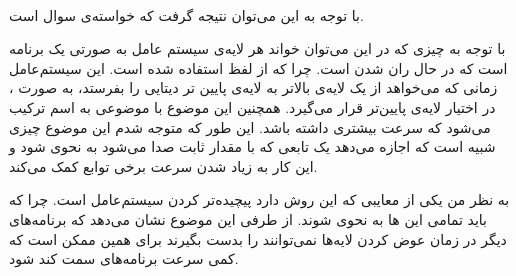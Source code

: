 \\
با توجه به این
می‌توان نتیجه گرفت که خواسته‌ی سوال
است.

\noindent
با توجه به چیزی که در این
می‌توان خواند هر لایه‌ی سیستم عامل به صورتی یک برنامه است که در حال ران شدن است. چرا که از لفظ
استفاده شده است. این سیستم‌عامل زمانی که می‌خواهد از یک لایه‌ی بالاتر به لایه‌ی پایین تر دیتایی را بفرستد،
به صورت
،
در اختیار لایه‌ی پایین‌تر قرار می‌گیرد. همچنین این موضوع با موضوعی به اسم
ترکیب می‌شود که سرعت بیشتری داشته باشد. این طور که متوجه شدم این موضوع چیزی شبیه 
است که اجازه می‌دهد یک تابعی که با مقدار ثابت صدا می‌شود به نحوی
شود و این کار به زیاد شدن سرعت برخی توابع کمک می‌کند.

\noindent
به نظر من یکی از معایبی که این روش دارد پیچیده‌تر کردن سیستم‌عامل است. چرا که باید تمامی این
ها
به نحوی
شوند. از طرفی این موضوع نشان می‌دهد که برنامه‌های دیگر در زمان عوض کردن لایه‌ها نمی‌توانند
را بدست بگیرند برای همین ممکن است که کمی سرعت برنامه‌های سمت
کند شود.





